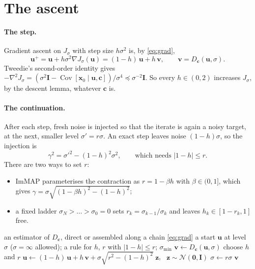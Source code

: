 \documentclass[11pt]{article}
\theoremstyle{remark}
\newcommand{\x}{\bm{x}}
\newcommand{\uu}{\bm{u}}
\newcommand{\vv}{\bm{v}}
\newcommand{\zz}{\bm{z}}
\newcommand{\cc}{\bm{c}}
\newcommand{\N}{\mathcal{N}}
\newcommand{\Id}{\bm{I}}
\newcommand{\grad}{\nabla}
\begin{document}
\section{The ascent}\label{sec:ascent}

\paragraph{The step.} Gradient ascent on $J_\sigma$ with step size $h\sigma^2$ is, by
\eqref{eq:grad},
\begin{equation}
  \boxed{\;\uu^+ = \uu + h\sigma^2\grad J_\sigma(\uu) = (1-h)\,\uu + h\,\vv,
  \qquad \vv = D_{\cc}(\uu,\sigma).\;}
  \label{eq:step}
\end{equation}
Tweedie's second-order identity gives $-\grad^2 J_\sigma = (\sigma^2\Id -
\operatorname{Cov}[\x_0\mid\uu,\cc])/\sigma^4\preceq\sigma^{-2}\Id$. So every $h\in(0,2)$
increases $J_\sigma$, by the descent lemma, whatever $\cc$ is.

\paragraph{The continuation.} After each step, fresh noise is injected so that the iterate is
again a noisy target, at the next, smaller level $\sigma' = r\sigma$. An exact step leaves noise
$(1-h)\sigma$, so the injection is
\begin{equation}
  \gamma^2 = \sigma'^2 - (1-h)^2\sigma^2,
  \qquad\text{which needs } |1-h|\le r .
  \label{eq:inject}
\end{equation}
There are two ways to set $r$:
\begin{itemize}[leftmargin=1.5em, itemsep=1pt]
  \item ImMAP parameterises the contraction as $r = 1-\beta h$ with $\beta\in(0,1]$, which gives
        $\gamma = \sigma\sqrt{(1-\beta h)^2-(1-h)^2}$;
  \item a fixed ladder $\sigma_N>\dots>\sigma_0=0$ sets $r_k = \sigma_{k-1}/\sigma_k$ and
        leaves $h_k\in[1-r_k,1]$ free.
\end{itemize}

\begin{algorithm}[H]
\caption{Annealed posterior ascent for $\max_{\x_0}\log p(\x_0\mid\cc)$}
\label{alg:ascent}
\begin{algorithmic}[1]
\Require an estimator of $D_{\cc}$, direct or assembled along a chain \eqref{eq:grad}
\Require a start $\uu$ at level $\sigma$ ($\sigma=\infty$ allowed); a rule for $h$, $r$ with
         $|1-h|\le r$; $\sigma_{\min}$
\While{$\sigma>\sigma_{\min}$}
  \State $\vv \gets D_{\cc}(\uu,\sigma)$
         \Comment{$=\uu + \sigma^2\grad J_\sigma(\uu)$}
  \State choose $h$ and $r$
  \State $\uu \gets (1-h)\,\uu + h\,\vv + \sigma\sqrt{r^2-(1-h)^2}\;\zz$, \ $\zz\sim\N(\bm0,\Id)$
         \Comment{\eqref{eq:step}, \eqref{eq:inject}}
  \State $\sigma \gets r\sigma$
\EndWhile
\State \Return $\vv$
\end{algorithmic}
\end{algorithm}
\end{document}
